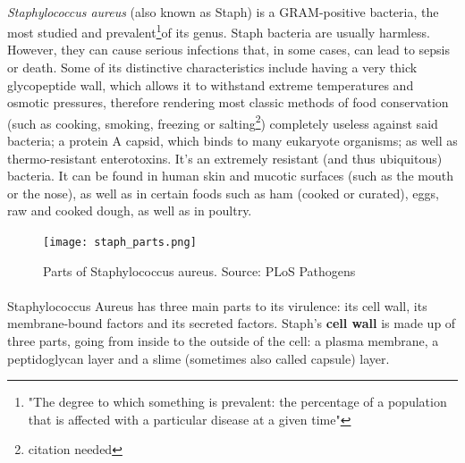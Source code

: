 \paragraph{}\emph{Staphylococcus aureus} (also known as Staph) is a GRAM-positive bacteria, the most studied and prevalent\footnote{"The degree to which something is prevalent: the percentage of a population that is affected with a particular disease at a given time"\cite{DefinitionPREVALENCE1970}}of its genus. Staph bacteria are usually harmless. However, they can cause serious infections that, in some cases, can lead to sepsis or death. Some of its distinctive characteristics include having a very thick glycopeptide wall, which allows it to withstand extreme temperatures and osmotic pressures, therefore rendering most classic methods of food conservation (such as cooking, smoking, freezing or salting\footnote{citation needed}) completely useless against said bacteria; a protein A capsid, which binds to many eukaryote organisms; as well as thermo-resistant enterotoxins. It's an extremely resistant (and thus ubiquitous) bacteria. It can be found in human skin and mucotic surfaces (such as the mouth or the nose), as well as in certain foods such as ham (cooked or curated), eggs, raw and cooked dough, as well as in poultry.\newpage
\begin{figure}\begin{center}\texttt{[image: staph\_parts.png]}\end{center}\caption{Parts of Staphylococcus aureus. Source: PLoS Pathogens}\end{figure}\paragraph{}Staphylococcus Aureus has three main parts to its virulence: its cell wall, its membrane-bound factors and its secreted factors. Staph's \textbf{cell wall} is made up of three parts, going from inside to the outside of the cell: a plasma membrane, a peptidoglycan layer and a slime (sometimes also called capsule) layer. %

